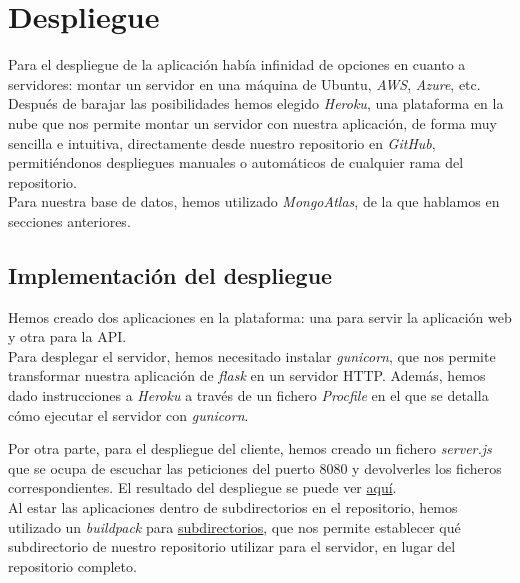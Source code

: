 \section{Despliegue}\label{sec:despliegue}
Para el despliegue de la aplicación había infinidad de opciones en cuanto a servidores: montar un servidor en una
máquina de Ubuntu, \textit{AWS}\cite{aws}, \textit{Azure}\cite{azure}, etc.\\

Después de barajar las posibilidades hemos elegido \textit{Heroku}, una plataforma en la nube que nos permite montar un
servidor con nuestra aplicación, de forma muy sencilla e intuitiva, directamente desde nuestro repositorio en
\textit{GitHub}, permitiéndonos despliegues manuales o automáticos de cualquier rama del repositorio.\\

Para nuestra base de datos, hemos utilizado \textit{MongoAtlas}, de la que hablamos en secciones anteriores.\\

\subsection{Implementación del despliegue}
Hemos creado dos aplicaciones en la plataforma: una para servir la aplicación web y otra para la API.\\

Para desplegar el servidor, hemos necesitado instalar \textit{gunicorn}\cite{gunicorn}, que nos permite transformar
nuestra aplicación de \textit{flask} en un servidor HTTP. Además, hemos dado instrucciones a \textit{Heroku} a través de
un fichero \textit{Procfile} en el que se detalla cómo ejecutar el servidor con \textit{gunicorn}.

Por otra parte, para el despliegue del cliente, hemos creado un fichero \textit{server.js} que se ocupa de escuchar las
peticiones del puerto 8080 y devolverles los ficheros correspondientes. El resultado del despliegue se puede ver
\href{http://flixbuff-front.herokuapp.com/}{aquí}.\\

Al estar las aplicaciones dentro de subdirectorios en el repositorio, hemos utilizado un \textit{buildpack} para
\href{https://github.com/timanovsky/subdir-heroku-buildpack.git}{subdirectorios}, que nos permite establecer qué
subdirectorio de nuestro repositorio utilizar para el servidor, en lugar del repositorio completo.\\

